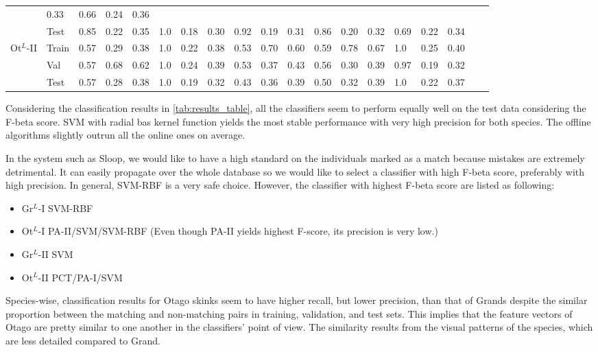 {\begin{landscape}
\begin{table}
\begin{tabular}{lllll|lll|lll|lll|lllll}
                                       & 0.33 & 0.66 & 0.24 & 0.36     \\
                                       & Test  & 0.85 & 0.22 & 0.35 & 1.0 & 0.18
                                       & 0.30 & 0.92 & 0.19 & 0.31 & 0.86 & 0.20
                                       & 0.32 & 0.69 & 0.22 & 0.34     \\
          \hline
          \multirow{3}{*}{Ot$^{L}$-II} & Train & 0.57 & 0.29 & 0.38 & 1.0 & 0.22
          & 0.38 & 0.53 & 0.70 & 0.60 & 0.59 & 0.78 & 0.67 & 1.0 & 0.25
          & 0.40     \\
                                       & Val  & 0.57 & 0.68 & 0.62 & 1.0 & 0.24
                                       & 0.39 & 0.53 & 0.37 & 0.43 & 0.56 & 0.30
                                       & 0.39 & 0.97 & 0.19 & 0.32   \\
                                       & Test  & 0.57 & 0.28 & 0.38  & 1.0
                                       & 0.19 & 0.32 & 0.43 & 0.36 & 0.39 & 0.50
                                       & 0.32 & 0.39 & 1.0 & 0.22 & 0.37     \\
          \bottomrule
        \end{tabular}
      \end{table}
    \end{landscape}
    \clearpage%
}

Considering the classification results in \ref{tab:results_table}, all the
classifiers seem to perform equally well on the test data considering the
F-beta score. SVM with radial bas kernel function yields the most stable
performance with very high precision for both species. The offline algorithms
slightly outrun all the online ones on average.

In the system such as Sloop, we would like to have a high standard on the
individuals marked as a match because mistakes are extremely detrimental. It
can easily propagate over the whole database so we would like to select a
classifier with high F-beta score, preferably with high precision. In general,
SVM-RBF is a very safe choice. However, the classifier with highest F-beta
score are listed as following:

\begin{itemize}
  \item Gr$^{L}$-I SVM-RBF
  \item Ot$^{L}$-I PA-II/SVM/SVM-RBF (Even though PA-II yields highest F-score,
  its precision is very low.)
  \item Gr$^{L}$-II SVM
  \item Ot$^{L}$-II PCT/PA-I/SVM
\end{itemize}

Species-wise, classification results for Otago skinks seem to have higher
recall, but lower precision, than that of Grands despite the similar proportion
between the matching and non-matching pairs in training, validation, and test
sets. This implies that the feature vectors of Otago are pretty similar to one
another in the classifiers' point of view. The similarity results from the
visual patterns of the species, which are less detailed compared to Grand.

